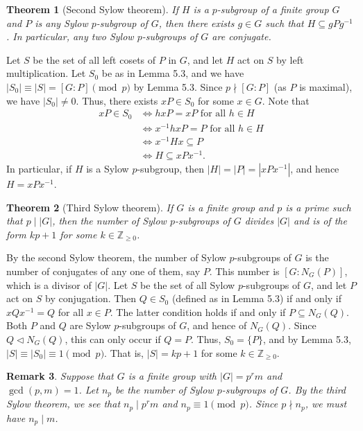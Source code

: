\documentclass[10pt]{article}
\makeatletter
\newcommand{\Z}{\mathbb{Z}}
\newcommand{\norm}{\triangleleft}
\theoremstyle{newstyle}
\newtheorem{thm}{Theorem}[section]
\newtheorem{remark}[thm]{Remark}
\newenvironment{pf}[1][\proofname]{\par
  \pushQED{\qed}%
  \normalfont \topsep0\p@\relax
  \trivlist
  \item[\hskip\labelsep\scshape
  #1\@addpunct{.}]\ignorespaces
}{%
  \popQED\endtrivlist\@endpefalse
}
\makeatother
\begin{document}
\begin{thm}[Second Sylow theorem]
If $H$ is a $p$-subgroup of a finite group $G$ and $P$ is any Sylow $p$-subgroup of $G$, then 
there exists $g \in G$ such that $H \subseteq gPg^{-1}$. In particular, any two Sylow 
$p$-subgroups of $G$ are conjugate.
\end{thm}
\begin{pf}
Let $S$ be the set of all left cosets of $P$ in $G$, and let $H$ act on $S$ by left multiplication.
Let $S_0$ be as in Lemma 5.3, and we have $|S_0| \equiv |S| = [G : P] \pmod p$ by Lemma 5.3. 
Since $p \nmid [G : P]$ (as $P$ is maximal), we have $|S_0| \neq 0$. Thus, there exists 
$xP \in S_0$ for some $x \in G$. Note that 
\begin{align*}
    xP \in S_0 &\iff hxP = xP \text{ for all } h \in H \\
    &\iff x^{-1}hxP = P \text{ for all } h \in H \\
    &\iff x^{-1}Hx \subseteq P \\
    &\iff H \subseteq xPx^{-1}.
\end{align*}
In particular, if $H$ is a Sylow $p$-subgroup, then $|H| = |P| = |xPx^{-1}|$, and hence 
$H = xPx^{-1}$. 
\end{pf}

\begin{thm}[Third Sylow theorem]
If $G$ is a finite group and $p$ is a prime such that $p \mid |G|$, then the number of Sylow 
$p$-subgroups of $G$ divides $|G|$ and is of the form $kp+1$ for some $k \in \Z_{\geq 0}$. 
\end{thm}
\begin{pf}
By the second Sylow theorem, the number of Sylow $p$-subgroups of $G$ is the number of 
conjugates of any one of them, say $P$. This number is $[G : N_G(P)]$, which is a divisor of $|G|$. 
Let $S$ be the set of all Sylow $p$-subgroups of $G$, and let $P$ act on $S$ by conjugation. 
Then $Q \in S_0$ (defined as in Lemma 5.3) if and only if $xQx^{-1} = Q$ for all $x \in P$. 
The latter condition holds if and only if $P \subseteq N_G(Q)$. Both $P$ and $Q$ are 
Sylow $p$-subgroups of $G$, and hence of $N_G(Q)$. Since $Q \norm N_G(Q)$, 
this can only occur if $Q = P$. Thus, $S_0 = \{P\}$, and by Lemma 5.3, $|S| \equiv |S_0| \equiv 1 
\pmod p$. That is, $|S| = kp+1$ for some $k \in \Z_{\geq0}$. 
\end{pf}

\begin{remark}
Suppose that $G$ is a finite group with $|G| = p^rm$ and $\gcd(p, m) = 1$. Let $n_p$ be the 
number of Sylow $p$-subgroups of $G$. By the third Sylow theorem, we see that $n_p \mid p^rm$ 
and $n_p \equiv 1 \pmod p$. Since $p \nmid n_p$, we must have $n_p \mid m$. 
\end{remark}
\end{document}

